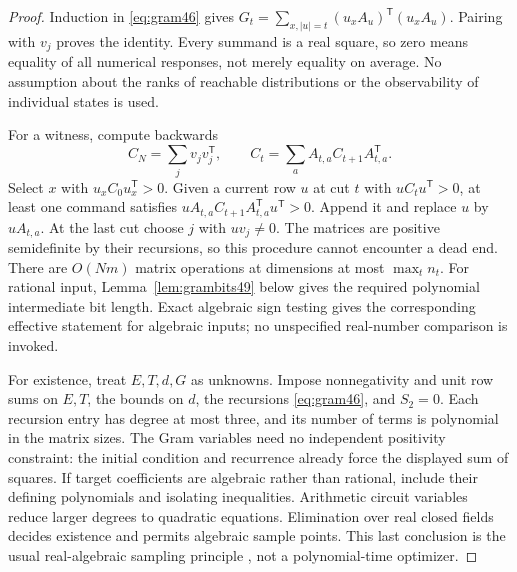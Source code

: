 \begin{proof}
Induction in \eqref{eq:gram46} gives
$G_t=\sum_{x,|u|=t}(u_xA_u)^{\mathsf T}(u_xA_u)$.
Pairing with $v_j$ proves the identity. Every summand is a real square,
so zero means equality of all numerical responses, not merely equality
on average. No assumption about the ranks of reachable distributions
or the observability of individual states is used.

For a witness, compute backwards
\[
 C_N=\sum_jv_jv_j^{\mathsf T},\qquad
 C_t=\sum_a A_{t,a}C_{t+1}A_{t,a}^{\mathsf T}.
\]
Select $x$ with $u_xC_0u_x^{\mathsf T}>0$. Given a current row $u$ at
cut $t$ with $uC_tu^{\mathsf T}>0$, at least one command satisfies
$uA_{t,a}C_{t+1}A_{t,a}^{\mathsf T}u^{\mathsf T}>0$.
Append it and replace $u$ by $uA_{t,a}$. At the last cut choose $j$
with $uv_j\ne0$. The matrices are positive semidefinite by their
recursions, so this procedure cannot encounter a dead end.
There are $O(Nm)$ matrix operations at dimensions at most
$\max_t n_t$. For rational input, Lemma~\ref{lem:grambits49} below gives the
required polynomial intermediate bit length.
Exact algebraic sign testing gives the corresponding effective
statement for algebraic inputs; no unspecified real-number comparison
is invoked.

For existence, treat $E,T,d,G$ as unknowns. Impose nonnegativity and
unit row sums on $E,T$, the bounds on $d$, the recursions
\eqref{eq:gram46}, and $S_2=0$. Each recursion entry has degree at most
three, and its number of terms is polynomial in the matrix sizes.
The Gram variables need no independent positivity constraint: the
initial condition and recurrence already force the displayed sum of
squares. If target coefficients are algebraic rather than rational,
include their defining polynomials and isolating inequalities. Arithmetic
circuit variables reduce larger degrees to quadratic equations.
Elimination over real closed fields decides existence and permits
algebraic sample points. This last conclusion is the usual
real-algebraic sampling principle \cite{BPR}, not a polynomial-time optimizer.
\end{proof}


